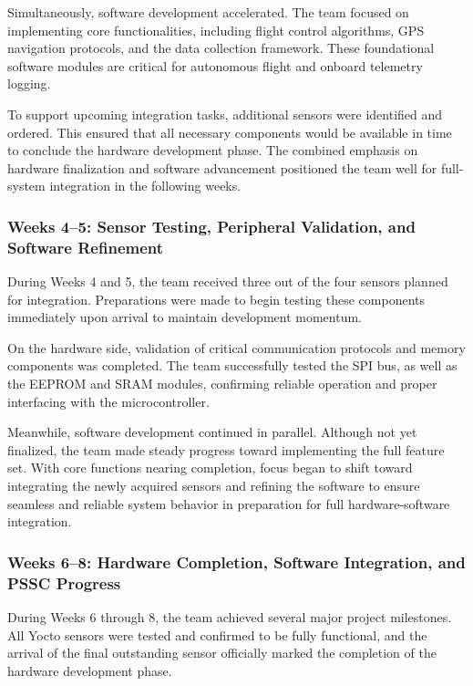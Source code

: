 \documentclass[12pt]{article}
\begin{document}
Simultaneously, software development accelerated. The team focused on implementing core functionalities, including flight control algorithms, GPS navigation protocols, and the data collection framework. These foundational software modules are critical for autonomous flight and onboard telemetry logging.

To support upcoming integration tasks, additional sensors were identified and ordered. This ensured that all necessary components would be available in time to conclude the hardware development phase. The combined emphasis on hardware finalization and software advancement positioned the team well for full-system integration in the following weeks.

\subsubsection*{Weeks 4–5: Sensor Testing, Peripheral Validation, and Software Refinement}

During Weeks 4 and 5, the team received three out of the four sensors planned for integration. Preparations were made to begin testing these components immediately upon arrival to maintain development momentum.

On the hardware side, validation of critical communication protocols and memory components was completed. The team successfully tested the SPI bus, as well as the EEPROM and SRAM modules, confirming reliable operation and proper interfacing with the microcontroller.

Meanwhile, software development continued in parallel. Although not yet finalized, the team made steady progress toward implementing the full feature set. With core functions nearing completion, focus began to shift toward integrating the newly acquired sensors and refining the software to ensure seamless and reliable system behavior in preparation for full hardware-software integration.

\subsubsection*{Weeks 6–8: Hardware Completion, Software Integration, and PSSC Progress}

During Weeks 6 through 8, the team achieved several major project milestones. All Yocto sensors were tested and confirmed to be fully functional, and the arrival of the final outstanding sensor officially marked the completion of the hardware development phase.
\end{document}
